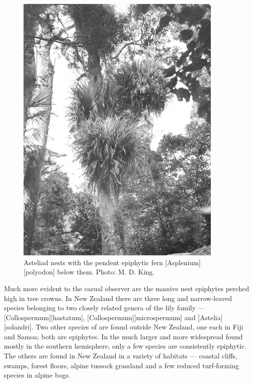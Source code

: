 \begin{figure}[htb]
\begin{minipage}[t]{0.543\textwidth}
    	\includegraphics[width=0.9\textwidth]{graphics/figure40asteliad.jpg}
    	\caption[Asteliad nests with the pendent epiphytic fern]{Asteliad nests with the pendent epiphytic fern [Asplenium][polyodon] below them.
    	Photo: M. D. King.}%
    	\label{fig:40asteliad}
	\end{minipage}
\end{figure}

Much more evident to the casual observer are the massive nest epiphytes perched high in tree crowns.
In New Zealand there are three long and narrow-leaved species belonging to two closely related genera of the lily family --- [Collospermum][hastatum], [Collospermum][microspermum] and [Astelia][solandri].
Two other species of  are found outside New Zealand, one each in Fiji and Samoa; both are epiphytes.
In the much larger and more widespread  found mostly in the southern hemisphere, only a few species are consistently epiphytic.
The others are found in New Zealand in a variety of habitats --- coastal cliffs, swamps, forest floors, alpine tussock grassland and a few reduced turf-forming species in alpine bogs.


